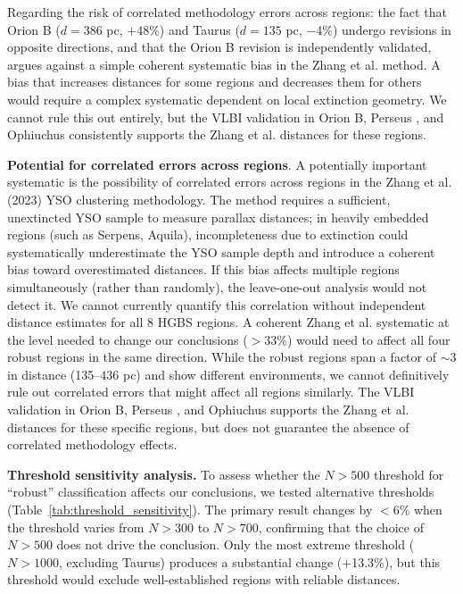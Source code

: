 \documentclass[twocolumn,usenatbib]{mnras}
\begin{document}
Regarding the risk of correlated methodology errors across regions: the fact that Orion B ($d = 386$ pc, $+$48\%) and Taurus ($d = 135$ pc, $-$4\%) undergo revisions in opposite directions, and that the Orion B revision is independently validated, argues against a simple coherent systematic bias in the Zhang et al. method. A bias that increases distances for some regions and decreases them for others would require a complex systematic dependent on local extinction geometry. We cannot rule this out entirely, but the VLBI validation in Orion B, Perseus \citep{OrtizLeon2018}, and Ophiuchus \citep{OrtizLeon2017} consistently supports the Zhang et al. distances for these regions.

\textbf{Potential for correlated errors across regions}. A potentially important systematic is the possibility of correlated errors across regions in the Zhang et al. (2023) YSO clustering methodology. The method requires a sufficient, unextincted YSO sample to measure parallax distances; in heavily embedded regions (such as Serpens, Aquila), incompleteness due to extinction could systematically underestimate the YSO sample depth and introduce a coherent bias toward overestimated distances. If this bias affects multiple regions simultaneously (rather than randomly), the leave-one-out analysis would not detect it. We cannot currently quantify this correlation without independent distance estimates for all 8 HGBS regions. A coherent Zhang et al. systematic at the level needed to change our conclusions ($>33$\%) would need to affect all four robust regions in the same direction. While the robust regions span a factor of $\sim$3 in distance (135--$436$ pc) and show different environments, we cannot definitively rule out correlated errors that might affect all regions similarly. The VLBI validation in Orion B, Perseus \citep{OrtizLeon2018}, and Ophiuchus \citep{OrtizLeon2017} supports the Zhang et al. distances for these specific regions, but does not guarantee the absence of correlated methodology effects.

\textbf{Threshold sensitivity analysis.}
To assess whether the $N > 500$ threshold for ``robust'' classification affects our conclusions, we tested alternative thresholds (Table~\ref{tab:threshold_sensitivity}). The primary result changes by $<$6\% when the threshold varies from $N > 300$ to $N > 700$, confirming that the choice of $N > 500$ does not drive the conclusion. Only the most extreme threshold ($N > 1000$, excluding Taurus) produces a substantial change ($+$13.3\%), but this threshold would exclude well-established regions with reliable distances.
\end{document}
